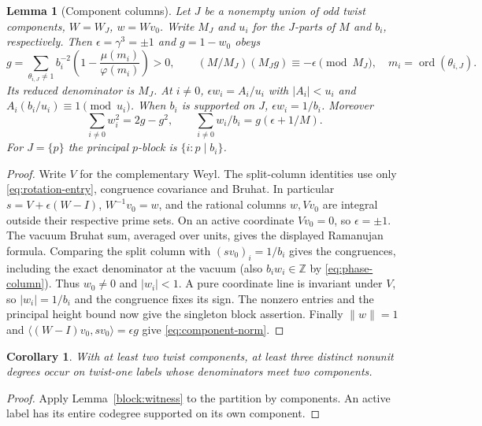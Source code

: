 \documentclass[11pt]{amsart}
\numberwithin{equation}{section}
\newtheorem{lemma}[theorem]{Lemma}
\newtheorem{corollary}[theorem]{Corollary}
\theoremstyle{definition}
\theoremstyle{plain}
\newcommand{\ZZ}{\mathbb Z}
\begin{document}
\begin{lemma}[Component columns]\label{result:component-column}
Let $J$ be a nonempty union of odd twist components, $W=W_J$, $w=Wv_0$.
Write $M_J$ and $u_i$ for the $J$-parts of $M$ and $b_i$,
respectively. Then $\epsilon=\gamma^3=\pm1$ and $g=1-w_0$ obeys
\[
 g=\sum_{\theta_{i,J}\ne1}b_i^{-2}
     \left(1-\frac{\mu(m_i)}{\varphi(m_i)}\right)>0,\qquad
 (M/M_J)(M_Jg)\equiv-\epsilon\pmod {M_J},
 \quad m_i=\operatorname{ord}(\theta_{i,J}).
\]
Its reduced denominator is $M_J$. At $i\ne0$,
$\epsilon w_i=A_i/u_i$ with $|A_i|<u_i$ and
$A_i(b_i/u_i)\equiv1\pmod{u_i}$. When $b_i$ is supported on $J$,
$\epsilon w_i=1/b_i$. Moreover
\begin{equation}\label{eq:component-norm}
 \sum_{i\ne0}w_i^2=2g-g^2,\qquad
 \sum_{i\ne0}w_i/b_i=g(\epsilon+1/M).
\end{equation}
For $J=\{p\}$ the principal $p$-block is $\{i:p\mid b_i\}$.
\end{lemma}
\begin{proof}
Write $V$ for the complementary Weyl. The split-column identities
\cite[Theorem~6.1, Lemma~6.2, Proposition~6.3]{BDPcore} use only
\eqref{eq:rotation-entry}, congruence covariance and Bruhat. In
particular $s=V+\epsilon(W-I)$, $W^{-1}v_0=w$, and the rational
columns $w,Vv_0$ are integral outside their respective prime sets.
On an active coordinate $Vv_0=0$, so $\epsilon=\pm1$.
The vacuum Bruhat sum, averaged over units, gives the displayed
Ramanujan formula. Comparing the split column with
$(sv_0)_i=1/b_i$ gives the congruences, including the exact
denominator at the vacuum (also $b_iw_i\in\ZZ$ by
\eqref{eq:phase-column}). Thus $w_0\ne0$ and $|w_i|<1$. A pure
coordinate line is invariant under $V$, so $|w_i|=1/b_i$ and
the congruence fixes its sign. The nonzero entries and the
principal height bound now give the singleton block assertion.
Finally $\|w\|=1$ and $\langle(W-I)v_0,sv_0\rangle=\epsilon g$
give \eqref{eq:component-norm}.
\end{proof}

\begin{corollary}\label{result:mixed-neutral-rank}
With at least two twist components, at least three distinct nonunit
degrees occur on twist-one labels whose denominators meet two
components.
\end{corollary}
\begin{proof}
Apply Lemma~\ref{block:witness} to the partition by components.
An active label has its entire codegree supported on its own component.
\end{proof}
\end{document}
